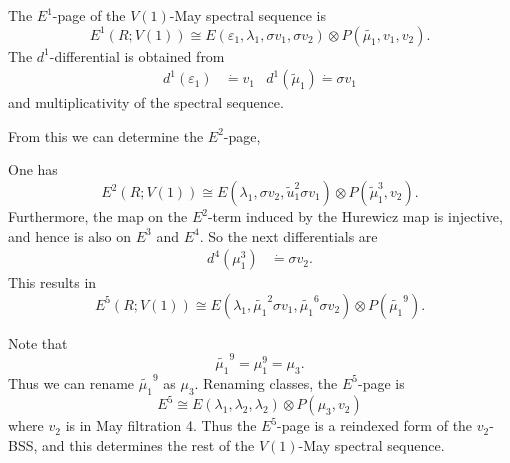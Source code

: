\begin{cor}
	The $E^1$-page of the $V(1)$-May spectral sequence is 
	\[
	E^1(R;V(1))\cong E(\varepsilon_1, \lambda_1, \sigma v_1, \sigma v_2)\otimes P(\widetilde{\mu_1},v_1,v_2).
	\]
	The $d^1$-differential is obtained from 
	\begin{align*}
		d^1(\varepsilon_1)&\dot{=}v_1 & d^1(\widetilde{\mu}_1)\dot{=}\sigma v_1
	\end{align*}
	and multiplicativity of the spectral sequence.
\end{cor}

From this we can determine the $E^2$-page,

\begin{cor}
	One has 
	\[
	E^2(R;V(1))\cong E(\lambda_1, \sigma v_2, \widetilde{u}_1^2\sigma v_1)\otimes P(\widetilde{\mu}_1^3, v_2).
	\]
	Furthermore, the map on the $E^2$-term induced by the Hurewicz map is injective, and hence is also on $E^3$ and $E^4$. So the next differentials are 
	\begin{align*}
		d^4(\mu_1^3) &\dot{=} \sigma v_2.
	\end{align*}
	This results in 
	\[
	E^5(R;V(1))\cong E(\lambda_1, \widetilde{\mu_1}^2\sigma v_1, \widetilde{\mu_1}^6\sigma v_2)\otimes P(\widetilde{\mu_1}^9).
	\]
\end{cor}

Note that 
\[
\widetilde{\mu_1}^9 = \mu_1^9 = \mu_3.
\]
Thus we can rename $\widetilde{\mu_1}^9$ as $\mu_3$. Renaming classes, the $E^5$-page is 
\[
E^5\cong E(\lambda_1, \lambda_2, \lambda_2)\otimes P(\mu_3,v_2)
\]
where $v_2$ is in May filtration 4. Thus the $E^5$-page is a reindexed form of the $v_2$-BSS, and this determines the rest of the $V(1)$-May spectral sequence.






